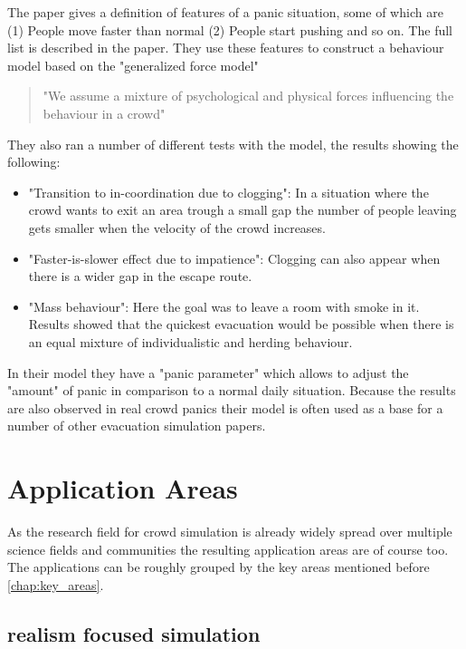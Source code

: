 \documentclass{acmsiggraph}               %
\begin{document}
The paper gives a definition of features of a panic situation, some of which are (1) People move faster than normal (2) People start pushing and so on. The full list is described in the paper. They use these features to construct a behaviour model based on the "generalized force model"\cite{hindsley_investigation_1986}
\begin{quote}
"We assume a mixture of psychological and physical forces influencing the behaviour in a crowd"
\end{quote}
They also ran a number of different tests with the model, the results showing the following:
\begin{itemize}
\item "Transition to in-coordination due to clogging": In a situation where the crowd wants to exit an area trough a small gap the number of people leaving gets smaller when the velocity of the crowd increases.
\item "Faster-is-slower effect due to impatience": Clogging can also appear when there is a wider gap in the escape route. 
\item "Mass behaviour": Here the goal was to leave a room with smoke in it. Results showed that the quickest evacuation would be possible when there is an equal mixture of individualistic and herding behaviour. 
\end{itemize}
In their model they have a "panic parameter" \label{term:panicParameter} which allows to adjust the "amount" of panic in comparison to a normal daily situation. Because the results are also observed in real crowd panics their model is often used as a base for a number of other evacuation simulation papers. \cite{braun_simulating_2005} \cite{zheng_modeling_2009}

\section{Application Areas}

As the research field for crowd simulation is already widely spread over multiple science fields and communities the resulting application areas are of course too. The applications can be roughly grouped by the key areas mentioned before \ref{chap:key_areas}. 

\subsection{realism focused simulation}
\end{document}
